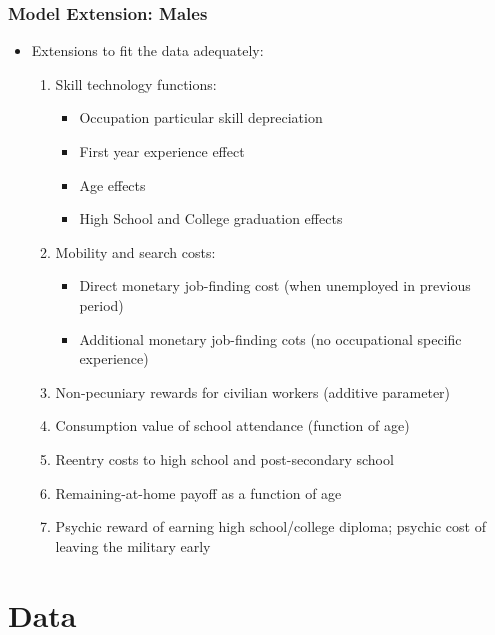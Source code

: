 \begin{frame}
	\frametitle{Model Extension: Males}
	\begin{itemize}
		\item Extensions to fit the data adequately:
		\begin{enumerate}
		\item Skill technology functions:
			\begin{itemize}
				\item Occupation particular skill depreciation
				\item First year experience effect
				\item Age effects
				\item High School and College graduation effects
			\end{itemize}
		\item Mobility and search costs:
			\begin{itemize}
				\item Direct monetary job-finding cost (when unemployed in previous period)
				\item Additional monetary job-finding cots (no occupational specific experience)
			\end{itemize}
		\item Non-pecuniary rewards for civilian workers (additive parameter)
		\item Consumption value of school attendance (function of age)
		\item Reentry costs to high school and post-secondary school
		\item Remaining-at-home payoff as a function of age
		\item Psychic reward of earning high school/college diploma; psychic cost of leaving the military early
		\end{enumerate}
	\end{itemize}
\end{frame}

\section{Data}

